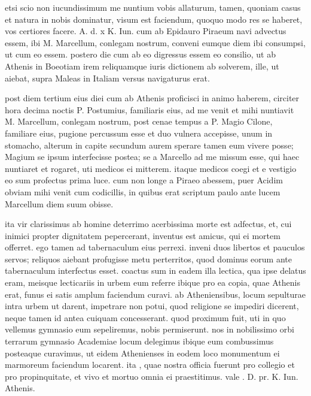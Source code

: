 


 etsi scio non iucundissimum me nuntium vobis allaturum, tamen, quoniam casus et natura in nobis dominatur, visum est faciendum, quoquo modo res se haberet, vos certiores facere. A. d. x K. Iun. cum ab Epidauro Piraeum navi advectus essem, ibi M. Marcellum, conlegam nostrum, conveni eumque diem ibi consumpsi, ut cum eo essem. postero die cum ab eo digressus essem eo consilio, ut ab Athenis in Boeotiam irem reliquamque iuris dictionem ab solverem, ille, ut aiebat, supra Maleas in Italiam versus navigaturus erat.

 post diem tertium eius diei cum ab Athenis proficisci in animo haberem, circiter hora decima noctis P. Postumius, familiaris eius, ad me venit et mihi nuntiavit M. Marcellum, conlegam nostrum, post cenae tempus a P. Magio Cilone, familiare eius, pugione percussum esse et duo vulnera accepisse, unum in stomacho, alterum in capite secundum aurem sperare tamen eum vivere posse; Magium se ipsum interfecisse postea; se a Marcello ad me missum esse, qui haec nuntiaret et rogaret, uti medicos ei mitterem. itaque medicos coegi et e vestigio eo sum profectus prima luce. cum non longe a Piraeo abessem, puer Acidim obviam mihi venit cum codicillis, in quibus erat scriptum paulo ante lucem Marcellum diem suum obisse.

 ita vir clarissimus ab homine deterrimo acerbissima morte est adfectus, et, cui inimici propter dignitatem pepercerant, inventus est amicus, qui ei mortem offerret. ego tamen ad tabernaculum eius perrexi. inveni duos libertos et pauculos servos; reliquos aiebant profugisse metu perterritos, quod dominus eorum ante tabernaculum interfectus esset. coactus sum in eadem illa lectica, qua ipse delatus eram, meisque lecticariis in urbem eum referre ibique pro ea copia, quae Athenis erat, funus ei satis amplum faciendum curavi. ab Atheniensibus, locum sepulturae intra urbem ut darent, impetrare non potui, quod religione se impediri dicerent, neque tamen id antea cuiquam concesserant. quod proximum fuit, uti in quo vellemus gymnasio eum sepeliremus, nobis permiserunt. nos in nobilissimo orbi terrarum gymnasio Academiae locum delegimus ibique eum combussimus posteaque curavimus, ut eidem Athenienses in eodem loco monumentum ei marmoreum faciendum locarent. ita , quae nostra officia fuerunt pro collegio et pro propinquitate, et vivo et mortuo omnia ei praestitimus. vale . D. pr. K. Iun. Athenis.
